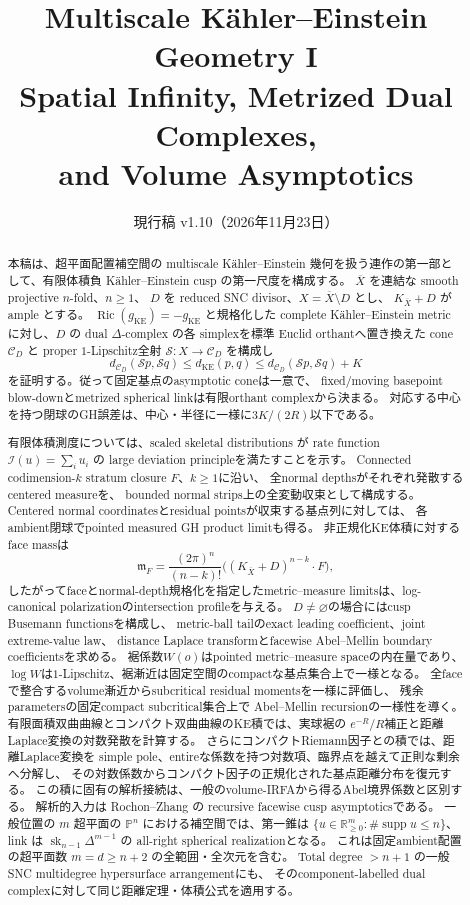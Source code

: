 \documentclass[11pt,a4paper]{ltjsarticle}
\title{\bfseries Multiscale K\"ahler--Einstein Geometry I\\[2mm]
\large Spatial Infinity, Metrized Dual Complexes,\\
and Volume Asymptotics}
\author{}
\date{現行稿 v1.10（2026年11月23日）}
\newcommand{\PP}{\mathbb P}
\newcommand{\RR}{\mathbb R}
\newcommand{\Ric}{\operatorname{Ric}}
\newcommand{\supp}{\operatorname{supp}}
\newcommand{\sk}{\operatorname{sk}}
\newcommand{\cC}{\mathcal C}
\newcommand{\cI}{\mathcal I}
\newcommand{\cS}{\mathcal S}
\newcommand{\ov}{\overline}
\theoremstyle{plain}
\theoremstyle{definition}
\theoremstyle{remark}
\begin{document}
\maketitle

\begin{abstract}
本稿は、超平面配置補空間の multiscale K\"ahler--Einstein 幾何を扱う連作の第一部として、有限体積負 K\"ahler--Einstein cusp の第一尺度を構成する。
$\ov X$ を連結な smooth projective $n$-fold、$n\ge1$、
$D$ を reduced SNC divisor、$X=\ov X\setminus D$ とし、
$K_{\ov X}+D$ が ample とする。
$\Ric(g_{\mathrm{KE}})=-g_{\mathrm{KE}}$ と規格化した complete K\"ahler--Einstein metric に対し、$D$ の dual $\Delta$-complex の各 simplexを標準 Euclid orthantへ置き換えた cone $\cC_D$ と proper $1$-Lipschitz全射 $\cS:X\to\cC_D$ を構成し
\[
 d_{\cC_D}(\cS p,\cS q)\le d_{\mathrm{KE}}(p,q)
 \le d_{\cC_D}(\cS p,\cS q)+K
\]
を証明する。従って固定基点のasymptotic coneは一意で、
fixed/moving basepoint blow-downとmetrized spherical linkは有限orthant complexから決まる。
対応する中心を持つ閉球のGH誤差は、中心・半径に一様に$3K/(2R)$以下である。

有限体積測度については、scaled skeletal distributions が rate function $\cI(u)=\sum_i u_i$ の large deviation principleを満たすことを示す。
Connected codimension-$k$ stratum closure $F$、$k\ge1$に沿い、
全normal depthsがそれぞれ発散するcentered measureを、
bounded normal strips上の全変動収束として構成する。
Centered normal coordinatesとresidual pointsが収束する基点列に対しては、
各ambient閉球でpointed measured GH product limitも得る。
非正規化KE体積に対するface massは
\[
 \mathfrak m_F=\frac{(2\pi)^n}{(n-k)!}
 \bigl((K_{\ov X}+D)^{n-k}\cdot F\bigr),
\]
したがってfaceとnormal-depth規格化を指定したmetric--measure limitsは、log-canonical polarizationのintersection profileを与える。
$D\ne\varnothing$の場合にはcusp Busemann functionsを構成し、
metric-ball tailのexact leading coefficient、joint extreme-value law、
distance Laplace transformとfacewise Abel--Mellin boundary coefficientsを求める。
裾係数$W(o)$はpointed metric--measure spaceの内在量であり、
$\log W$は$1$-Lipschitz、裾漸近は固定空間のcompactな基点集合上で一様となる。
全faceで整合するvolume漸近からsubcritical residual momentsを一様に評価し、
残余parametersの固定compact subcritical集合上で
Abel--Mellin recursionの一様性を導く。
有限面積双曲曲線とコンパクト双曲曲線のKE積では、実球裾の
$e^{-R}/R$補正と距離Laplace変換の対数発散を計算する。
さらにコンパクトRiemann因子との積では、距離Laplace変換を
simple pole、entireな係数を持つ対数項、臨界点を越えて正則な剰余へ分解し、
その対数係数からコンパクト因子の正規化された基点距離分布を復元する。
この積に固有の解析接続は、一般のvolume-IRFAから得るAbel境界係数と区別する。
解析的入力は Rochon--Zhang の recursive facewise cusp asymptoticsである。
一般位置の $m$ 超平面の $\PP^n$ における補空間では、第一錐は
$\{u\in\RR_{\ge0}^m:\#\supp u\le n\}$、link は $\sk_{n-1}\Delta^{m-1}$ の all-right spherical realizationとなる。
これは固定ambient配置の超平面数 $m=d\ge n+2$ の全範囲・全次元を含む。
Total degree $>n+1$ の一般SNC multidegree hypersurface arrangementにも、
そのcomponent-labelled dual complexに対して同じ距離定理・体積公式を適用する。
\end{abstract}
\end{document}
